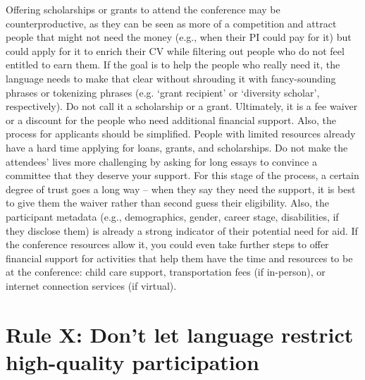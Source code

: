 \documentclass[10pt,letterpaper]{article}
\begin{document}

Offering scholarships or grants to attend the conference may be counterproductive, as they can be seen as more of a competition and attract people that might not need the money (e.g., when their PI could pay for it) but could apply for it to enrich their CV while filtering out people who do not feel entitled to earn them. If the goal is to help the people who really need it, the language needs to make that clear without shrouding it with fancy-sounding phrases or tokenizing phrases (e.g. `grant recipient' or `diversity scholar', respectively). Do not call it a scholarship or a grant. Ultimately, it is a fee waiver or a discount for the people who need additional financial support. Also, the process for applicants should be simplified. People with limited resources already have a hard time applying for loans, grants, and scholarships. Do not make the attendees' lives more challenging by asking for long essays to convince a committee that they deserve your support. For this stage of the process, a certain degree of trust goes a long way -- when they say they need the support, it is best to give them the waiver rather than second guess their eligibility. Also, the participant metadata (e.g., demographics, gender, career stage, disabilities, if they disclose them) is already a strong indicator of their potential need for aid. If the conference resources allow it, you could even take further steps to offer financial support for activities that help them have the time and resources to be at the conference: child care support, transportation fees (if in-person), or internet connection services (if virtual). 

\section{Rule X: Don't let language restrict high-quality participation}
\label{rule_language}
\end{document}
